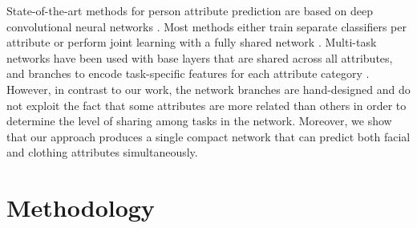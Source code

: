 \documentclass[10pt,twocolumn,letterpaper]{article}
\begin{document}
State-of-the-art methods for person attribute prediction are based on deep convolutional neural networks \cite{wang2016walk,liu2015deep,chen2015deep,zhang2014panda}. Most methods either train separate classifiers per attribute \cite{zhang2014panda} or perform joint learning with a fully shared network \cite{rudd2016moon}.  Multi-task networks have been used with base layers that are shared across all attributes, and branches to encode task-specific features for each attribute category \cite{huang2015cross,sudowe2015person}. However, in contrast to our work, the network branches are hand-designed and do not exploit the fact that some attributes are more related than others in order to determine the level of sharing among tasks in the network. Moreover, we show that our approach produces a single compact network that can predict both facial and clothing attributes simultaneously.

\section{Methodology}
\end{document}
